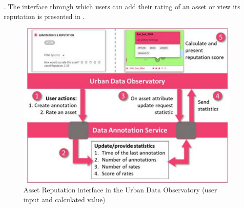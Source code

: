 . The interface through which users can add their rating of an asset or view its reputation is presented in .

\begin{figure}
	\centering
	\includegraphics[scale = .65]{figures/repu1}
	\caption{Asset Reputation interface in the Urban Data Observatory (user input and calculated value)}
	\label{fig:rep}	
\end{figure}


